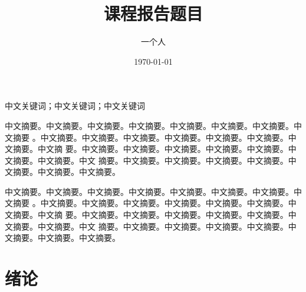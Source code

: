 \documentclass[supercite]{HustGraduPaper}
\title{课程报告题目}
\author{一个人}
\date{\today}
\theoremstyle{definition}
\begin{document}
\maketitle


\clearpage


\begin{cnabstract}{中文关键词；中文关键词；中文关键词}

中文摘要。中文摘要。中文摘要。中文摘要。中文摘要。中文摘要。中文摘要。中文摘要
。中文摘要。中文摘要。中文摘要。中文摘要。中文摘要。中文摘要。中文摘要。中文摘
要。中文摘要。中文摘要。中文摘要。中文摘要。中文摘要。中文摘要。中文摘要。中文
摘要。中文摘要。中文摘要。中文摘要。中文摘要。中文摘要。中文摘要。中文摘要。

中文摘要。中文摘要。中文摘要。中文摘要。中文摘要。中文摘要。中文摘要。中文摘要
。中文摘要。中文摘要。中文摘要。中文摘要。中文摘要。中文摘要。中文摘要。中文摘
要。中文摘要。中文摘要。中文摘要。中文摘要。中文摘要。中文摘要。中文摘要。中文
摘要。中文摘要。中文摘要。中文摘要。中文摘要。中文摘要。中文摘要。中文摘要。

\end{cnabstract}





\tableofcontents[level=2]
\clearpage


\section{绪论}
\end{document}
